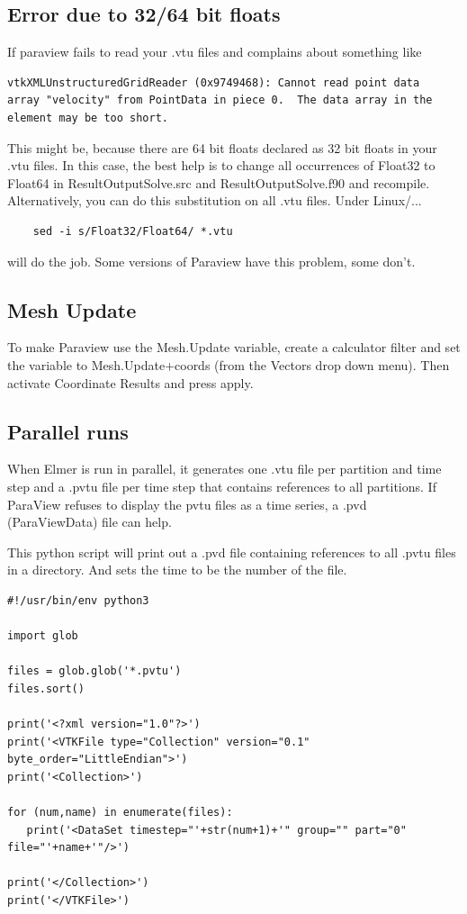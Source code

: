 \subsection{Error due to 32/64 bit floats}

If paraview fails to read your .vtu files and complains about something like

\begin{verbatim}
vtkXMLUnstructuredGridReader (0x9749468): Cannot read point data 
array "velocity" from PointData in piece 0.  The data array in the
element may be too short.
\end{verbatim}

This might be, because there are 64 bit floats declared as 32 bit floats in your .vtu files. In this case, the best help is to change all occurrences of Float32 to Float64 in ResultOutputSolve.src and ResultOutputSolve.f90 and recompile. Alternatively, you can do this substitution on all .vtu files. Under Linux/...

\begin{verbatim}
    sed -i s/Float32/Float64/ *.vtu
\end{verbatim}

\noindent will do the job. Some versions of Paraview have this problem, some don't.

\subsection{Mesh Update}

To make Paraview use the Mesh.Update variable, create a calculator filter and set the variable to Mesh.Update+coords (from the Vectors drop down menu). Then activate Coordinate Results and press apply. 

\subsection{Parallel runs}

When Elmer is run in parallel, it generates one .vtu file per partition and time step and a .pvtu file per time step that contains references to all partitions. If ParaView refuses to display the pvtu files as a time series, a .pvd (ParaViewData) file can help.

This python script will print out a .pvd file containing references to all .pvtu files in a directory. And sets the time to be the number of the file.

\begin{verbatim}
#!/usr/bin/env python3

import glob

files = glob.glob('*.pvtu')
files.sort()

print('<?xml version="1.0"?>')
print('<VTKFile type="Collection" version="0.1" byte_order="LittleEndian">')
print('<Collection>')

for (num,name) in enumerate(files):
   print('<DataSet timestep="'+str(num+1)+'" group="" part="0" file="'+name+'"/>')

print('</Collection>')
print('</VTKFile>')
\end{verbatim}

